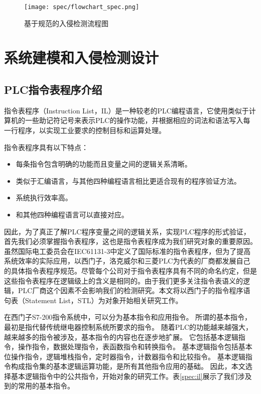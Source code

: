 \begin{figure}[!htb]
		\centering
		\texttt{[image: spec/flowchart\_spec.png]}
		\caption{基于规范的入侵检测流程图}
		\label{fig21}
	\end{figure}

\section{系统建模和入侵检测设计}
\label{sec:matheq}

\subsection{PLC指令表程序介绍}

指令表程序（Instruction  List，IL）是一种较老的PLC编程语言，它使用类似于计算机的一些助记符记号来表示PLC的操作功能，并根据相应的词法和语法写入每一行程序，以实现工业要求的控制目标和运算处理。

指令表程序具有以下特点：

\begin{itemize}
\item 每条指令包含明确的功能而且变量之间的逻辑关系清晰。 
\item 类似于汇编语言，与其他四种编程语言相比更适合现有的程序验证方法。 
\item 系统执行效率高。
\item 和其他四种编程语言可以直接对应。
\end{itemize}

因此，为了真正了解PLC程序变量之间的逻辑关系，实现PLC程序的形式验证，首先我们必须掌握指令表程序，这也是指令表程序成为我们研究对象的重要原因。虽然国际电工委员会在IEC61131-3中定义了国际标准的指令表程序，但为了提高系统效率的实际应用，以西门子，洛克威尔和三菱PLC为代表的厂商都发展自己的具体指令表程序规范。尽管每个公司对于指令表程序具有不同的命名约定，但是这些指令表程序在逻辑级上的含义是相同的。由于我们更多关注指令表语义的逻辑，PLC厂商这个因素不会影响我们的检测研究。本文将以西门子的指令程序语句表（Statement  List，STL）为对象开始相关研究工作。

在西门子S7-200指令系统中，可以分为基本指令和应用指令。 所谓的基本指令，最初是指代替传统继电器控制系统所要求的指令。 随着PLC的功能越来越强大，越来越多的指令被涉及，基本指令的内容也在逐步地扩展。 它包括基本逻辑指令，操作指令，数据处理指令，表函数指令和转换指令。 基本逻辑指令包括基本位操作指令，逻辑堆栈指令，定时器指令，计数器指令和比较指令。 基本逻辑指令构成指令集的基本逻辑运算功能，是所有其他指令应用的基础。 因此，本文选择基本逻辑指令中的公共指令，开始对象的研究工作。表\ref{spec:il}展示了我们涉及到的常用的基本指令。

